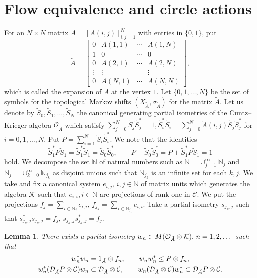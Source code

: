 \documentclass[11pt]{article}
\newtheorem{lemma}[theorem]{Lemma}
\theoremstyle{plain}
\theoremstyle{definition}
\numberwithin{equation}{section}
\newcommand{\N}{\mathbb{N}}
\begin{document}
\section{Flow equivalence and circle actions}
For an $N \times N$ matrix
$A = [A(i,j)]_{i,j=1}^N$
with entries in $\{0,1\}$,
put
\begin{equation}
\tilde{A} =
\begin{bmatrix}
0      & A(1,1) & \cdots & A(1,N) \\
1      & 0      & \cdots & 0      \\
0      & A(2,1) & \cdots & A(2,N) \\
\vdots & \vdots &        & \vdots \\
0      & A(N,1) & \cdots & A(N,N)
\end{bmatrix}, \label{eq:tildeA}
\end{equation}
which is called the expansion of $A$ at the vertex $1$.
Let 
$\{0,1,\dots,N\}$
be the set of symbols for the topological Markov shifts $(X_{\tilde{A}},\sigma_{\tilde{A}})$
for the matrix $\tilde{A}$.
Let us denote by 
$\tilde{S}_0, \tilde{S}_1,\dots, \tilde{S}_N$
the canonical generating partial isometries of the Cuntz--Krieger algebra
${\mathcal{O}}_{\tilde{A}}$
which satisfy
$\sum_{j=0}^N
\tilde{S}_j\tilde{S}_j^* =1,
\tilde{S}_i^*\tilde{S}_i
= \sum_{j=0}^N
\tilde{A}(i,j) \tilde{S}_j\tilde{S}_j^*
$ 
for $i=0,1,\dots,N$.
Put
$
P = \sum_{i=1}^N
\tilde{S}_i\tilde{S}_i^*.
$
We note that the identities 
\begin{equation}
 \tilde{S}_1^* P \tilde{S}_1 
=\tilde{S}_1^* \tilde{S}_1 = \tilde{S}_0 \tilde{S}_0^*,\qquad
P + \tilde{S}_0 \tilde{S}_0^* =P + \tilde{S}_1^* P \tilde{S}_1 =1
\label{eq:PtildeS}
\end{equation}
hold.
We decompose the set $\N$ of natural numbers such as 
$\N = \cup_{j=1}^\infty \N_j$ and 
$\N_j = \cup_{k=0}^\infty \N_{j_k}$ as disjoint unions such that 
$\N_{j_k}$ is an infinite set for each $k, j$.  
We take and fix a canonical system  
$e_{i,j},\,  i,j \in \N$
of matrix units which generates the algebra
${\mathcal{K}}$
such that $e_{i,i}, i\in \N$ are projections of rank one in $\mathcal{C}$.
We put the projections
$
f_j = \sum_{i \in\N_j} e_{i,i}, \,
f_{j_k} = \sum_{i \in\N_{j_k}} e_{i,i}.
$
Take a partial isometry $s_{j_k,j}$ such that
$s_{j_k,j}^* s_{j_k,j} = f_j, \, s_{j_k,j} s_{j_k,j}^* = f_j.$  
\begin{lemma}
There exists a partial isometry
$w_n \in M({{\mathcal{O}}_{\tilde{A}}\otimes{\mathcal{K}}}),\, n=1,2,\dots $
such that 
\begin{gather*}
w_n^* w_n = 1_{\tilde{A}}\otimes f_n, \qquad
w_n w_n^* \le P \otimes f_n, \\
w_n^*({\mathcal{D}}_{\tilde{A}} P\otimes{\mathcal{C}})w_n \subset
 {{\mathcal{D}}_{\tilde{A}}\otimes{\mathcal{C}}},
 \qquad
 w_n({{\mathcal{D}}_{\tilde{A}}\otimes{\mathcal{C}}})w_n^* \subset {\mathcal{D}}_{\tilde{A}} P\otimes{\mathcal{C}}.   
\end{gather*}
\end{lemma}
\end{document}
